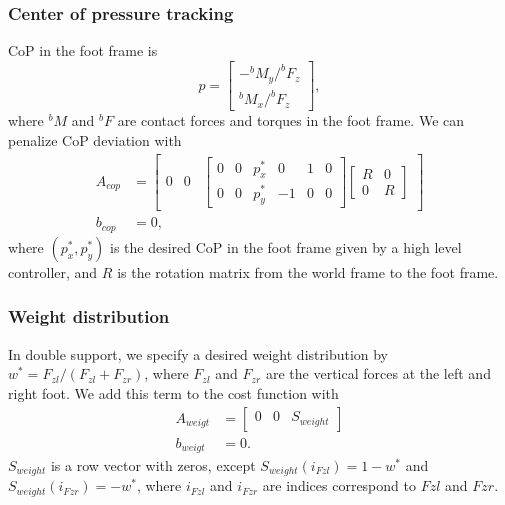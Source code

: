 \documentclass{ws-ijhr}
\begin{document}
\subsubsection{Center of pressure tracking} 
CoP in the foot frame is
\begin{equation*}
  p = \begin{bmatrix} -^{b}M_{y} / ^{b}F_{z} \\ ^{b}M_{x} / ^{b}F_{z} \end{bmatrix},
\end{equation*}
where $^{b}M$ and $^{b}F$ are contact forces and torques in the foot frame.
We can penalize CoP deviation with
\begin{equation*}
  \begin{split}
    A_{cop} &= \begin{bmatrix} 0 & 0 & \begin{bmatrix} 0 & 0 & p_x^* & 0 & 1 & 0 \\ 0 & 0 & p_y^* & -1 & 0 & 0 \end{bmatrix} \begin{bmatrix} R & 0 \\ 0 & R \end{bmatrix} \end{bmatrix} \\
    b_{cop} &= 0,
  \end{split}
\end{equation*}
where $(p_x^*, p_y^*)$ is the desired CoP in the foot frame given by
a high level controller, and $R$ is the rotation matrix from the world frame to
the foot frame.

\subsubsection{Weight distribution} 
In double support, we specify a desired weight distribution by  
$w^* = F_{zl} / (F_{zl}+F_{zr})$, where $F_{zl}$ and $F_{zr}$ are the vertical 
forces at the left and right foot. We add this term to the cost function with
\begin{equation*}
  \begin{split}
    A_{weigt} &= \begin{bmatrix} 0 & 0 & S_{weight} \end{bmatrix} \\
    b_{weigt} &= 0.
  \end{split}
\end{equation*}
$S_{weight}$ is a row vector with zeros, except $S_{weight}(i_{Fzl}) = 1-w^*$ and 
$S_{weight}(i_{Fzr}) = -w^*$, where $i_{Fzl}$ and $i_{Fzr}$ are indices correspond
to $Fzl$ and $Fzr$.
\end{document}
